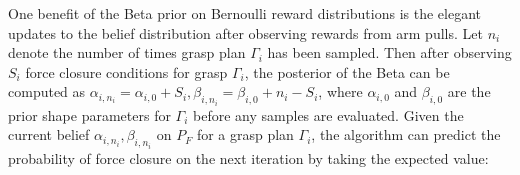 \documentclass[journal,transmag]{IEEEtran}%
\begin{document}

One benefit of the Beta prior on Bernoulli reward distributions is the elegant updates to the belief distribution after observing rewards from arm pulls.
Let $n_i$ denote the number of times grasp plan $\Gamma_i$ has been sampled.
Then after observing $S_i$ force closure conditions for grasp $\Gamma_i$, the posterior of the Beta can be computed as $\alpha_{i, n_i} = \alpha_{i, 0} + S_i, \beta_{i, n_i} = \beta_{i, 0} + n_i - S_i$, where $\alpha_{i,0}$ and $\beta_{i,0}$ are the prior shape parameters for $\Gamma_i$ before any samples are evaluated.
Given the current belief $\alpha_{i, n_i}, \beta_{i, n_i}$ on $P_F$ for a grasp plan $\Gamma_i$, the algorithm can predict the probability of force closure on the next iteration by taking the expected value:
\end{document}
